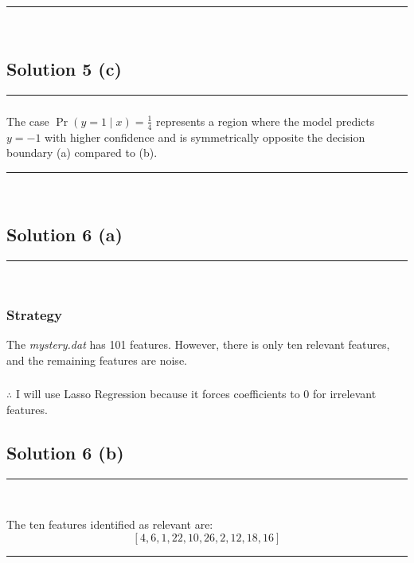 \documentclass{article}
\begin{document}
\noindent\rule{\textwidth}{0.4pt}\\

\newpage

\subsection*{Solution 5 (c)}
\noindent\rule{\textwidth}{0.4pt}

\subsubsection*{}

\parbox{\textwidth}{
The case $\operatorname{Pr}(y=1 \mid x) = \frac{1}{4}$ represents a region where the model predicts $y=-1$ with higher confidence and is symmetrically opposite the decision boundary (a) compared to (b).
}
\noindent\rule{\textwidth}{0.4pt}\\

\newpage
\subsection*{Solution 6 (a)}
\noindent\rule{\textwidth}{0.4pt}\\

\subsubsection*{Strategy}
\parbox{\textwidth}{
The \textit{mystery.dat} has 101 features. However, there is only ten relevant features, and the remaining features are noise. 
}

\subsubsection*{\normalfont}{$\therefore$ I will use Lasso Regression because it forces coefficients to 0 for irrelevant features.}


\newpage

\subsection*{Solution 6 (b)}
\noindent\rule{\textwidth}{0.4pt}\\

\parbox{\textwidth}{
The ten features identified as relevant are:
\[
[4, 6, 1, 22, 10, 26, 2, 12, 18, 16]
\]
}

\noindent\rule{\textwidth}{0.4pt}\\
\end{document}
